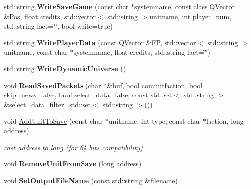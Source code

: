 \begin{DoxyCompactItemize}
\item 
std\+::string {\bfseries Write\+Save\+Game} (const char $\ast$systemname, const class Q\+Vector \&Pos, float credits, std\+::vector$<$ std\+::string $>$unitname, int player\+\_\+num, std\+::string fact=\char`\"{}\char`\"{}, bool write=true)\hypertarget{classSaveGame_a5fbbfd50c8ac59ec3886c0c5fae566a9}{}\label{classSaveGame_a5fbbfd50c8ac59ec3886c0c5fae566a9}

\item 
std\+::string {\bfseries Write\+Player\+Data} (const Q\+Vector \&FP, std\+::vector$<$ std\+::string $>$unitname, const char $\ast$systemname, float credits, std\+::string fact=\char`\"{}\char`\"{})\hypertarget{classSaveGame_a726d1d03d9ca92110c70a59a92d8ce99}{}\label{classSaveGame_a726d1d03d9ca92110c70a59a92d8ce99}

\item 
std\+::string {\bfseries Write\+Dynamic\+Universe} ()\hypertarget{classSaveGame_ae8f71d86cd13a5804336a750e86f0555}{}\label{classSaveGame_ae8f71d86cd13a5804336a750e86f0555}

\item 
void {\bfseries Read\+Saved\+Packets} (char $\ast$\&buf, bool commitfaction, bool skip\+\_\+news=false, bool select\+\_\+data=false, const std\+::set$<$ std\+::string $>$ \&select\+\_\+data\+\_\+filter=std\+::set$<$ std\+::string $>$())\hypertarget{classSaveGame_aa032552a729e860cb179e148b27e3b71}{}\label{classSaveGame_aa032552a729e860cb179e148b27e3b71}

\item 
void \hyperlink{classSaveGame_a7a561bdec21674e51588acb8b02acb7a}{Add\+Unit\+To\+Save} (const char $\ast$unitname, int type, const char $\ast$faction, long address)\hypertarget{classSaveGame_a7a561bdec21674e51588acb8b02acb7a}{}\label{classSaveGame_a7a561bdec21674e51588acb8b02acb7a}

\begin{DoxyCompactList}\small\item\em cast address to long (for 64 bits compatibility) \end{DoxyCompactList}\item 
void {\bfseries Remove\+Unit\+From\+Save} (long address)\hypertarget{classSaveGame_a983bbdde0a8a94bc34e030de62d2e9fd}{}\label{classSaveGame_a983bbdde0a8a94bc34e030de62d2e9fd}

\item 
void {\bfseries Set\+Output\+File\+Name} (const std\+::string \&filename)\hypertarget{classSaveGame_a59ff4a547f172c77a0ca1ea94c3d985b}{}\label{classSaveGame_a59ff4a547f172c77a0ca1ea94c3d985b}


\end{DoxyCompactItemize}
